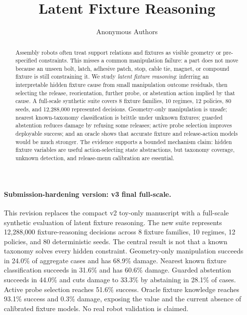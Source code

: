 \documentclass{article}
\title{Latent Fixture Reasoning}
\author{Anonymous Authors}
\date{}
\begin{document}
\maketitle

\paragraph{Submission-hardening version: v3 final full-scale.}
This revision replaces the compact v2 toy-only manuscript with a full-scale
synthetic evaluation of latent fixture reasoning. The new suite represents
12,288,000 fixture-reasoning decisions across 8 fixture families, 10 regimes,
12 policies, and 80 deterministic seeds. The central result is not that a
known taxonomy solves every hidden constraint. Geometry-only manipulation
succeeds in 24.0\% of aggregate cases and has 68.9\% damage. Nearest known
fixture classification succeeds in 31.6\% and has 60.6\% damage. Guarded
abstention succeeds in 44.0\% and cuts damage to 33.3\% by abstaining in
28.1\% of cases. Active probe selection reaches 51.6\% success. Oracle fixture
knowledge reaches 93.1\% success and 0.3\% damage, exposing the value and the
current absence of calibrated fixture models. No real robot validation is
claimed.

\begin{abstract}
Assembly robots often treat support relations and fixtures as visible geometry
or pre-specified constraints. This misses a common manipulation failure: a part
does not move because an unseen bolt, latch, adhesive patch, stop, cable tie,
magnet, or compound fixture is still constraining it. We study
\emph{latent fixture reasoning}: inferring an interpretable hidden fixture
cause from small manipulation outcome residuals, then selecting the release,
reorientation, further probe, or abstention action implied by that cause. A
full-scale synthetic suite covers 8 fixture families, 10 regimes, 12 policies,
80 seeds, and 12,288,000 represented decisions. Geometry-only manipulation is
unsafe; nearest known-taxonomy classification is brittle under unknown
fixtures; guarded abstention reduces damage by refusing some releases; active
probe selection improves deployable success; and an oracle shows that accurate
fixture and release-action models would be much stronger. The evidence
supports a bounded mechanism claim: hidden fixture variables are useful
action-selecting state abstractions, but taxonomy coverage, unknown detection,
and release-menu calibration are essential.
\end{abstract}
\end{document}
